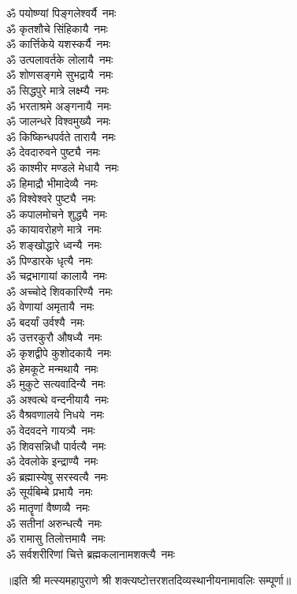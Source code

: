\begin{multicols}{2}
\begin{flushleft}
ॐ पयोष्ण्यां पिङ्गलेश्वर्यै~नमः\\
ॐ कृतशौचे सिंहिकायै~नमः\\
ॐ कार्त्तिकेये यशस्कर्यै~नमः\\
ॐ उत्पलावर्तके लोलायै~नमः\\
ॐ शोणसङ्गमे सुभद्रायै~नमः\\
ॐ सिद्धपुरे मात्रे लक्ष्म्यै~नमः\\
ॐ भरताश्रमे अङ्गनायै~नमः\\
ॐ जालन्धरे विश्वमुख्यै~नमः\hfill{}\\
ॐ किष्किन्धपर्वते तारायै~नमः\\
ॐ देवदारुवने पुष्ट्यै~नमः\\
ॐ काश्मीर मण्डले मेधायै~नमः\\
ॐ हिमाद्रौ भीमादेव्यै~नमः\\
ॐ विश्वेश्वरे पुष्ट्यै~नमः\\
ॐ कपालमोचने शुद्ध्यै~नमः\\
ॐ कायावरोहणे मात्रे~नमः\\
ॐ शङ्खोद्धारे ध्वन्यै~नमः\\
ॐ पिण्डारके धृत्यै~नमः\\
ॐ चद्रभागायां कालायै~नमः\hfill{}\\
ॐ अच्चोदे शिवकारिण्यै~नमः\\
ॐ वेणायां अमृतायै~नमः\\
ॐ बदर्यां उर्वश्यै~नमः\\
ॐ उत्तरकुरौ औषध्यै~नमः\\
ॐ कृशद्वीपे कुशोदकायै~नमः\\
ॐ हेमकूटे मन्मथायै~नमः\\
ॐ मुकुटे सत्यवादिन्यै~नमः\\
ॐ अश्वत्थे वन्दनीयायै~नमः\\
ॐ वैश्रवणालये निधये~नमः\\
ॐ वेदवदने गायत्र्यै~नमः\hfill{}\\
ॐ शिवसन्निधौ पार्वत्यै~नमः\\
ॐ देवलोके इन्द्राण्यै~नमः\\
ॐ ब्रह्मास्येषु सरस्वत्यै~नमः\\
ॐ सूर्यबिम्बे प्रभायै~नमः\\
ॐ मातॄणां वैष्णव्यै~नमः\\
ॐ सतीनां अरुन्धत्यै~नमः\\
ॐ रामासु तिलोत्तमायै~नमः\\
ॐ सर्वशरीरिणां चित्ते ब्रह्मकलानामशक्त्यै~नमः\\
\end{flushleft}
\end{multicols}
॥इति श्री मत्स्यमहापुराणे श्री शक्त्यष्टोत्तर\-शतदिव्यस्थानीयनामावलिः सम्पूर्णा॥
